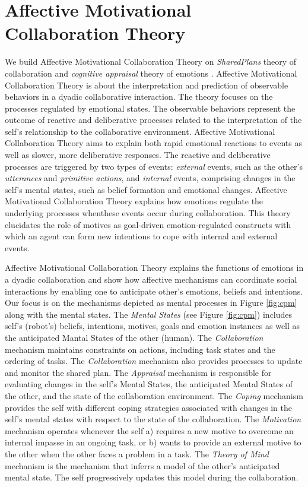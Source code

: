 \documentclass[letterpaper]{article}
\begin{document}
\section{Affective Motivational Collaboration Theory}

We build Affective Motivational Collaboration Theory on \textit{SharedPlans}
theory of collaboration \cite{grosz:plans-discourse} and \textit{cognitive
appraisal} theory of emotions \cite{gratch:domain-independent}. Affective
Motivational Collaboration Theory is about the interpretation and prediction of
observable behaviors in a dyadic collaborative interaction. The theory focuses
on the processes regulated by emotional states. The observable behaviors
represent the outcome of reactive and deliberative processes related to the
interpretation of the self's relationship to the collaborative environment.
Affective Motivational Collaboration Theory aims to explain both rapid emotional
reactions to events as well as slower, more deliberative responses. The reactive
and deliberative processes are triggered by two types of events:
\textit{external} events, such as the other's \textit{utterances} and
\textit{primitive actions}, and \textit{internal} events, comprising changes in
the self's mental states, such as belief formation and emotional changes.
Affective Motivational Collaboration Theory explains how emotions regulate the
underlying processes whenthese events occur during collaboration. This theory
elucidates the role of motives as goal-driven emotion-regulated constructs with
which an agent can form new intentions to cope with internal and external
events.

Affective Motivational Collaboration Theory explains the functions of emotions
in a dyadic collaboration and show how affective mechanisms can coordinate
social interactions by enabling one to anticipate other's emotions, beliefs and
intentions. Our focus is on the mechanisms depicted as mental processes in
Figure \ref{fig:cpm} along with the mental states. The \textit{Mental States}
(see Figure \ref{fig:cpm}) includes self's (robot's) beliefs, intentions,
motives, goals and emotion instances as well as the anticipated Mantal States of
the other (human). The \textit{Collaboration} mechanism maintains constraints on
actions, including task states and the ordering of tasks. The
\textit{Collaboration} mechanism also provides processes to update and monitor
the shared plan. The \textit{Appraisal} mechanism is responsible for evaluating
changes in the self's Mental States, the anticipated Mental States of the other,
and the state of the collaboration environment. The \textit{Coping} mechanism
provides the self with different coping strategies associated with changes in
the self's mental states with respect to the state of the collaboration. The
\textit{Motivation} mechanism operates whenever the self a) requires a new
motive to overcome an internal impasse in an ongoing task, or b) wants to
provide an external motive to the other when the other faces a problem in a
task. The \textit{Theory of Mind} mechanism is the mechanism that inferrs a
model of the other's anticipated mental state. The self progressively updates
this model during the collaboration.
\end{document}
